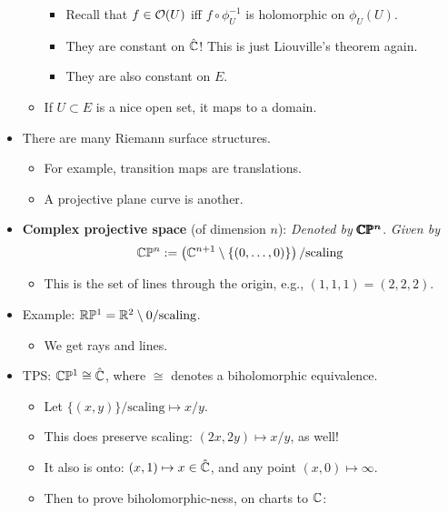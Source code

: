 \documentclass[../notes.tex]{subfiles}
\begin{document}
\begin{itemize}
\begin{itemize}
        \begin{itemize}
            \item Recall that $f\in\mathcal{O}(U)$ iff $f\circ\phi_U^{-1}$ is holomorphic on $\phi_U(U)$.
            \item They are constant on $\hat{\mathbb{C}}$! This is just Liouville's theorem again.
            \item They are also constant on $E$.
        \end{itemize}
        \item If $U\subset E$ is a nice open set, it maps to a domain.
    \end{itemize}
    \item There are many Riemann surface structures.
    \begin{itemize}
        \item For example, transition maps are translations.
        \item A projective plane curve is another.
    \end{itemize}
    \item \textbf{Complex projective space} (of dimension $n$): \emph{Denoted by} $\bm{\pmb{\mathbb{C}}\pmb{\mathbb{P}}^n}$. \emph{Given by}
    \begin{equation*}
        \mathbb{C}\mathbb{P}^n := \left( \mathbb{C}^{n+1}\setminus\{(0,\dots,0)\} \right)/\text{scaling}
    \end{equation*}
    \begin{itemize}
        \item This is the set of lines through the origin, e.g., $(1,1,1)=(2,2,2)$.
    \end{itemize}
    \item Example: $\mathbb{R}\mathbb{P}^1=\mathbb{R}^2\setminus 0/\text{scaling}$.
    \begin{itemize}
        \item We get rays and lines.
    \end{itemize}
    \item TPS: $\mathbb{C}\mathbb{P}^1\cong\hat{\mathbb{C}}$, where $\cong$ denotes a biholomorphic equivalence.
    \begin{itemize}
        \item Let $\{(x,y)\}/\text{scaling}\mapsto x/y$.
        \item This does preserve scaling: $(2x,2y)\mapsto x/y$, as well!
        \item It also is onto: $(x,1)\mapsto x\in\hat{\mathbb{C}}$, and any point $(x,0)\mapsto\infty$.
        \item Then to prove biholomorphic-ness, on charts to $\mathbb{C}$:

\end{itemize}
\end{itemize}
\end{document}
